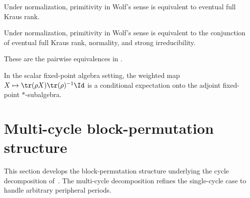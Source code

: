 \begin{theorem}%
    \label{thm:wolf_6_8_kraus_span}
    \leanok
    Under normalization, primitivity in Wolf's sense is equivalent to eventual
    full Kraus rank.
\end{theorem}

\begin{theorem}%
    \label{thm:wolf_6_8_conjunction}
    \leanok
    Under normalization, primitivity in Wolf's sense is equivalent to the conjunction
    of eventual full Kraus rank, normality, and strong irreducibility.
\end{theorem}

\begin{remark}
    \label{rem:wolf_6_8_pairwise}
    \leanok
    These are the pairwise equivalences in
    \cite[Theorem~6.8]{Wolf2012Quantum}.
\end{remark}

\begin{theorem}
    \label{thm:wolf_6_15_scalar_conditional_expectation}
    \leanok
    In the scalar fixed-point algebra setting, the weighted map
    $X\mapsto\tr(\rho X)\tr(\rho)^{-1}\Id$ is a conditional expectation
    onto the adjoint fixed-point $*$-subalgebra.
\end{theorem}

\section{Multi-cycle block-permutation structure}

This section develops the block-permutation structure underlying the
cycle decomposition of~\cite[Theorem~6.16]{Wolf2012Quantum}. The
multi-cycle decomposition refines the single-cycle case to handle
arbitrary peripheral periods.

